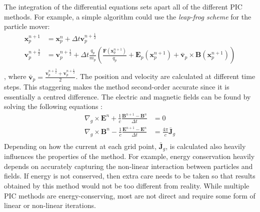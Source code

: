 The integration of the differential equations sets apart all of the different PIC methods. For example, a simple algorithm could use the \textit{leap-frog scheme} for the particle mover: 
\begin{align*}
	\textbf{x}_p^{n+1} &= \textbf{x}_p^n + \Delta t \textbf{v}_p^{n+\frac{1}{2}} \\
	\textbf{v}_p^{n+\frac{3}{2}} &= \textbf{v}_p^{n+\frac{1}{2}} + \Delta t \frac{q_p}{m_p}\left(\frac{\textbf{F}(\textbf{x}_p^{n+1})}{q_p} +\textbf{E}_p(\textbf{x}_p^{n+1}) + \bar{\textbf{v}}_p \times \textbf{B}(\textbf{x}_p^{n+1})\right)\\
\end{align*},
where $\bar{\textbf{v}}_p=\frac{\textbf{v}_p^{n+\frac{3}{2}}+\textbf{v}_p^{n+\frac{1}{2}}}{2}$.
The position and velocity are calculated at different time steps. This staggering makes the method second-order accurate since it is essentially a centred difference. The electric and magnetic fields can be found by solving the following equations \cite{jiang_origin_1996}:
  \begin{align*}
	\nabla_g \times \mathbf{E}^{n} +\frac{1}{c}\frac{\mathbf{B}^{n+1} - \mathbf{B}^{n}}{\Delta t} &= 0 \\
	\nabla_g \times \mathbf{B}^{n} -\frac{1}{c}\frac{\mathbf{E}^{n+1} - \mathbf{E}^{n}}{\Delta t} &= \frac{4 \pi}{c}\bar{\mathbf{J}}_g\\
\end{align*}
Depending on how the current at each grid point, $\bar{\mathbf{J}}_g$, is calculated also heavily influences the properties of the method. For example, energy conservation heavily depends on accurately capturing the non-linear interaction between particles and fields. If energy is not conserved, then extra care needs to be taken so that results obtained by this method would not be too different from reality. While multiple PIC methods are energy-conserving, most are not direct and require some form of linear or non-linear iterations. \cite{giovanni_lapenta_introduction_nodate}

